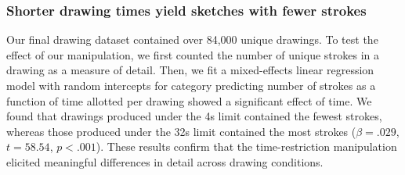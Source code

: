 \documentclass[10pt,letterpaper]{article}
\begin{document}
\subsubsection{Shorter drawing times yield sketches with fewer strokes}
Our final drawing dataset contained over 84,000 unique drawings. 
To test the effect of our manipulation, we first counted the number of unique strokes in a drawing as a measure of detail.
Then, we fit a mixed-effects linear regression model with random intercepts for category predicting number of strokes as a function of time allotted per drawing showed a significant effect of time.
We found that drawings produced under the 4s limit contained the fewest strokes, whereas those produced under the 32s limit contained the most strokes ($\beta=.029$, $t=58.54$, $p<.001$).
These results confirm that the time-restriction manipulation elicited meaningful differences in detail across drawing conditions.

\end{document}
